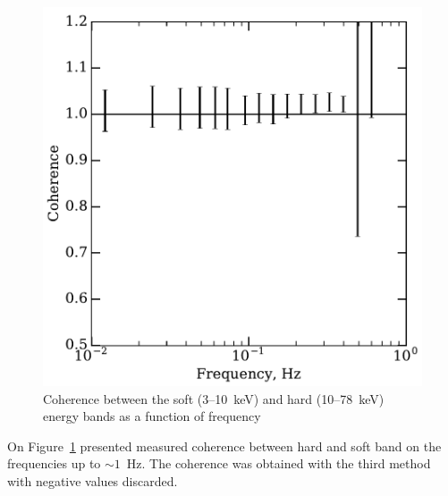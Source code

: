 \begin{figure}
    \includegraphics[width=\columnwidth]{coherence_grs.pdf}
    \caption{Coherence between the soft (3--10~keV) and hard (10--78~keV) energy bands as a function of frequency} 
    \label{fig:coherence}
\end{figure}


On Figure~\ref{fig:coherence} presented measured coherence between hard and soft band on the frequencies up to $\sim1$~Hz. 
The coherence was obtained with the third method with negative values discarded. 




